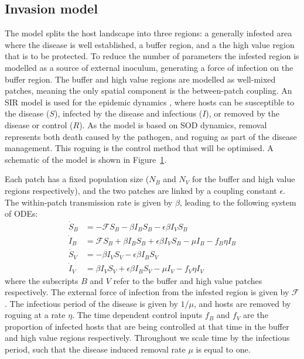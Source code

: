 \subsection{Invasion model}

The model splits the host landscape into three regions: a generally infested area where the disease is well established, a buffer region, and a the high value region that is to be protected. To reduce the number of parameters the infested region is modelled as a source of external inoculum, generating a force of infection on the buffer region. The buffer and high value regions are modelled as well-mixed patches, meaning the only spatial component is the between-patch coupling. An SIR model is used for the epidemic dynamics \citep{keeling_modeling_2008}, where hosts can be susceptible to the disease ($S$), infected by the disease and infectious ($I$), or removed by the disease or control ($R$). As the model is based on SOD dynamics, removal represents both death caused by the pathogen, and roguing as part of the disease management. This roguing is the control method that will be optimised. A schematic of the model is shown in Figure~\ref{fig:ch3:model_schematic}.

\begin{figure}
    \begin{center}
        \caption[Model schematic]{\label{fig:ch3:model_schematic}}
    \end{center}
\end{figure}

Each patch has a fixed population size ($N_B$ and $N_V$ for the buffer and high value regions respectively), and the two patches are linked by a coupling constant $\epsilon$. The within-patch transmission rate is given by $\beta$, leading to the following system of ODEs:
\begin{subequations}\label{eqn:ch3:patch_model}
    \begin{align}
        \dot{S}_B &= -\mathcal{F}S_B - \beta{}I_BS_B - \epsilon\beta{}I_VS_B \label{eqn:ch3:patch_model_a}\\
        \dot{I}_B &= \mathcal{F}S_B + \beta{}I_BS_B + \epsilon\beta{}I_VS_B - \mu{}I_B-f_B\eta{}I_B \label{eqn:ch3:patch_model_b}\\
        \dot{S}_V &= -\beta{}I_VS_V - \epsilon\beta{}I_BS_V \label{eqn:ch3:patch_model_c}\\
        \dot{I}_V &= \beta{}I_VS_V + \epsilon\beta{}I_BS_V - \mu{}I_V-f_V\eta{}I_V \label{eqn:ch3:patch_model_d}
    \end{align}
\end{subequations}
where the subscripts $B$ and $V$ refer to the buffer and high value patches respectively. The external force of infection from the infested region is given by $\mathcal{F}$. The infectious period of the disease is given by $1/\mu$, and hosts are removed by roguing at a rate $\eta$. The time dependent control inputs $f_B$ and $f_V$ are the proportion of infected hosts that are being controlled at that time in the buffer and high value regions respectively. Throughout we scale time by the infectious period, such that the disease induced removal rate $\mu$ is equal to one.

